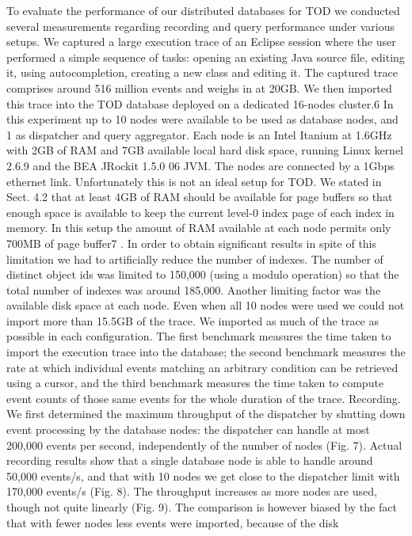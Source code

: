 \documentclass[12pt,a4paper]{report}
\begin{document}
To evaluate the performance of our distributed databases for TOD we conducted several measurements regarding recording and query performance under various setups. We captured a large execution trace of an Eclipse session where the user performed a simple sequence of tasks: opening an existing Java source file, editing it, using autocompletion, creating a new class and editing it. The captured trace
comprises around 516 million events and weighs in at 20GB. We then imported
this trace into the TOD database deployed on a dedicated 16-nodes cluster.6
     In this experiment up to 10 nodes were available to be used as database
nodes, and 1 as dispatcher and query aggregator. Each node is an Intel Itanium
at 1.6GHz with 2GB of RAM and 7GB available local hard disk space, running
Linux kernel 2.6.9 and the BEA JRockit 1.5.0 06 JVM. The nodes are connected
by a 1Gbps ethernet link. Unfortunately this is not an ideal setup for TOD. We
stated in Sect. 4.2 that at least 4GB of RAM should be available for page buffers
so that enough space is available to keep the current level-0 index page of each
index in memory. In this setup the amount of RAM available at each node
permits only 700MB of page buffer7 . In order to obtain significant results in
spite of this limitation we had to artificially reduce the number of indexes. The
number of distinct object ids was limited to 150,000 (using a modulo operation)
so that the total number of indexes was around 185,000. Another limiting factor
was the available disk space at each node. Even when all 10 nodes were used we
could not import more than 15.5GB of the trace. We imported as much of the
trace as possible in each configuration.
     The first benchmark measures the time taken to import the execution trace
into the database; the second benchmark measures the rate at which individual
events matching an arbitrary condition can be retrieved using a cursor, and the
third benchmark measures the time taken to compute event counts of those same
events for the whole duration of the trace.
Recording. We first determined the maximum throughput of the dispatcher by
shutting down event processing by the database nodes: the dispatcher can handle
at most 200,000 events per second, independently of the number of nodes (Fig. 7).
Actual recording results show that a single database node is able to handle
around 50,000 events/s, and that with 10 nodes we get close to the dispatcher
limit with 170,000 events/s (Fig. 8). The throughput increases as more nodes
are used, though not quite linearly (Fig. 9). The comparison is however biased
by the fact that with fewer nodes less events were imported, because of the disk
\end{document}
